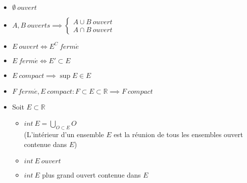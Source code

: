 	\begin{myprop}~
		\begin{itemize}
			\item $\emptyset~ouvert$
			\item $A,B ~ ouverts\implies\begin{cases}
			A\cup B~ouvert\\
			A\cap B ~ ouvert
			\end{cases}$
			\item $E~ouvert\Longleftrightarrow E^C~ferm\acute{e}$
			\item $E~ferm\acute{e}\Longleftrightarrow E'\subset E$
			\item $E~compact\implies\sup E\in E$
			\item $F~ferm\acute{e},E~compact : F\subset E\subset\mathbb{R}\implies F~compact$
			\item Soit $E\subset\mathbb{R}$\begin{itemize}
				\item $int~E=\bigcup\limits_{O\subset E}O$ \\
				(L'intérieur d'un ensemble $E$ est la réunion de tous les ensembles ouvert contenue dans $E$)
				\item $int~E~ouvert$
				\item $int~E$ plus grand ouvert contenue dans $E$
			\end{itemize}
		\end{itemize}
	\end{myprop}
